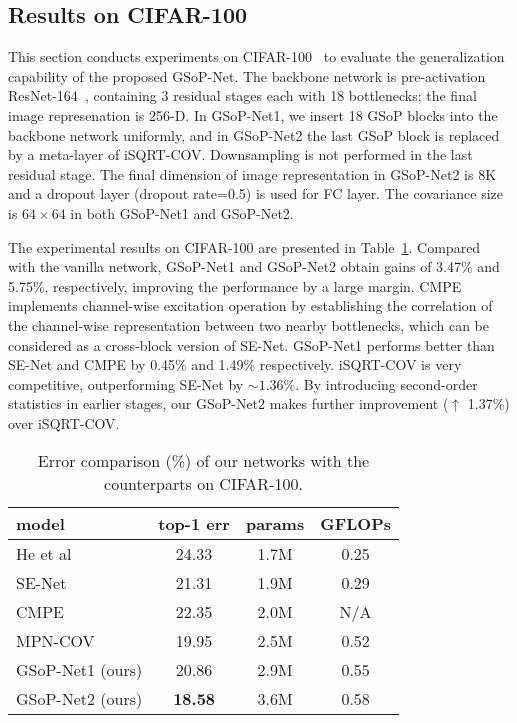 \documentclass[10pt,twocolumn,letterpaper]{article}
\begin{document}
\subsection{Results on CIFAR-100}

This section conducts experiments on CIFAR-100~\cite{CIFAR} to evaluate the generalization capability of the proposed GSoP-Net.  The backbone network is pre-activation ResNet-164~\cite{He2016_ECCV}, containing 3 residual stages each with 18 bottlenecks; the final image represenation is 256-D. In GSoP-Net1, we insert 18 GSoP blocks into the backbone network uniformly, and in GSoP-Net2 the last GSoP block is replaced by a meta-layer of iSQRT-COV.  Downsampling is not performed in the last residual stage. The final dimension of image representation in GSoP-Net2 is 8K and  a dropout layer (dropout rate=0.5) is used for FC layer. The covariance size is  $64\times 64$ in both GSoP-Net1 and GSoP-Net2.

The experimental results on CIFAR-100  are presented in Table~\ref{tab:CIFAR-100}. Compared with the vanilla  network, GSoP-Net1 and GSoP-Net2 obtain gains of 3.47\% and 5.75\%, respectively, improving the performance by a large margin.  CMPE~\cite{hu2018competitive} implements channel-wise excitation operation by establishing the correlation of the channel-wise representation between two nearby bottlenecks, which can be considered as a cross-block version of SE-Net.
GSoP-Net1 performs better than SE-Net and CMPE by 0.45\% and 1.49\% respectively.   iSQRT-COV is very competitive, outperforming SE-Net by $\sim\!\!\! 1.36\%$. By introducing second-order statistics in earlier stages, our GSoP-Net2 makes further improvement ($\uparrow$ 1.37\%) over iSQRT-COV. 


\begin{table}[tb!]
	\centering
	\setlength{\tabcolsep}{2pt}
	\footnotesize
	\renewcommand\arraystretch{1.2}
	\begin{tabular}{l|c|c|c}
		\hline
		model & top-1 err & params & GFLOPs \\ 
		\hline
		He et al~\cite{He2016_ECCV}      & 24.33 & 1.7M & 0.25\\
		\hline
		SE-Net~\cite{SE_pami}           & 21.31 & 1.9M & 0.29\\	
		CMPE~\cite{hu2018competitive}    & 22.35 & 2.0M & N$/$A\\	
		MPN-COV~\cite{Li_2018_CVPR}      & 19.95 & 2.5M & 0.52\\
		\hline
		GSoP-Net1 (ours) & 20.86 & 2.9M & 0.55 \\
		GSoP-Net2 (ours) & \textbf{18.58} & 3.6M & 0.58\\
		\hline		
	\end{tabular}%
	\caption{Error comparison  (\%) of our networks with the counterparts on CIFAR-100.}
	\label{tab:CIFAR-100}%
\end{table} 
\end{document}
